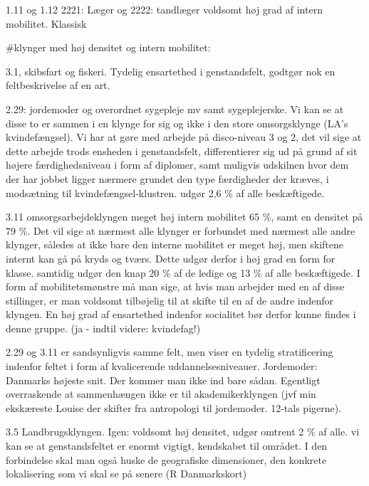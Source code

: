 

1.11 og 1.12
2221: Læger og 2222: tandlæger voldsomt høj grad af intern mobilitet. Klassisk

#klynger med høj densitet og intern mobilitet:

3.1, skibsfart og fiskeri. Tydelig ensartethed i genstandsfelt, godtgør nok en feltbeskrivelse af en art.

2.29: jordemoder og overordnet sygepleje mv samt sygeplejerske. Vi kan se at disse to er sammen i en klynge for sig og ikke i den store omsorgsklynge (LA's kvindefængsel). Vi har at gøre med arbejde på disco-niveau 3 og 2, det vil sige at dette arbejde trods ensheden i genstandsfelt, differentierer sig ud på grund af sit højere færdighedsniveau i form af diplomer, samt muligvis udskilnen hvor dem der har jobbet ligger nærmere grundet den type færdigheder der kræves, i modsætning til kvindefængsel-klustren. udgør 2,6 \% af alle beskæftigede.

3.11 omsorgsarbejdeklyngen meget høj intern mobilitet 65 \%, samt en densitet på 79 \%. Det vil sige at nærmest alle klynger er forbundet med nærmest alle andre klynger, således at ikke bare den interne mobilitet er meget høj, men skiftene internt kan gå på kryds og tværs. Dette udgør derfor i høj grad en form for klasse. samtidig udgør den knap 20 \% af de ledige og 13 \% af alle beskæftigede. I form af mobilitetsmønstre må man sige, at hvis man arbejder med en af disse stillinger, er man voldsomt tilbøjelig til at skifte til en af de andre indenfor klyngen. En høj grad af ensartethed indenfor socialitet bør derfor kunne findes i denne gruppe. (ja - indtil videre: kvindefag!) 

2.29 og 3.11 er sandsynligvis samme felt, men viser en tydelig stratificering indenfor feltet i form af kvalicerende uddannelsesniveauer. Jordemoder: Danmarks højeste snit. Der kommer man ikke ind bare sådan. Egentligt overraskende at sammenhængen ikke er til akademikerklyngen (jvf min ekskæreste Louise der skifter fra antropologi til jordemoder. 12-tals pigerne). 

3.5 Landbrugsklyngen. Igen: voldsomt høj densitet, udgør omtrent 2 \% af alle. vi kan se at genstandsfeltet er enormt vigtigt, kendskabet til området. I den forbindelse skal man også huske de geografiske dimensioner, den konkrete lokalisering som vi skal se på senere (R Danmarkskort)

